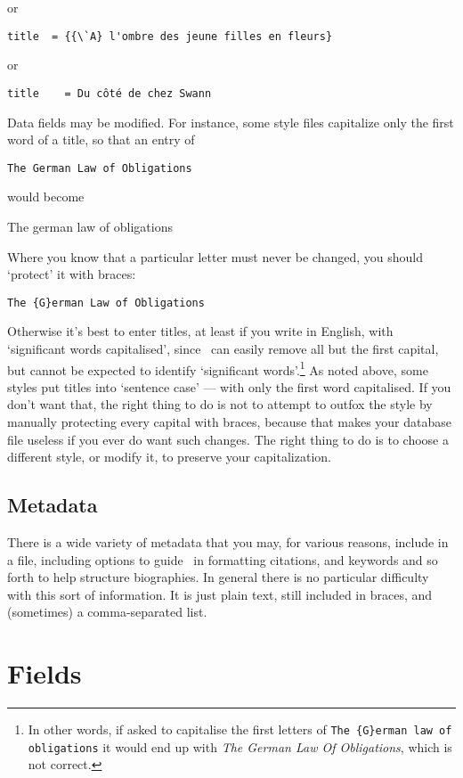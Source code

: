 {\begin{center}
or

\verb|title  = {{\`A} l'ombre des jeune filles en fleurs}|

or

\verb|title    = Du côté de chez Swann|
\end{center}

Data fields may be modified. For instance, some style files capitalize only the first word of a title, so that an entry of
\begin{center}
\verb|The German Law of Obligations|
\end{center}
would become
\begin{center}
The german law of obligations
\end{center}
Where you know that a particular letter must never be changed, you should `protect' it with braces:
\begin{center}
\verb|The {G}erman Law of Obligations|
\end{center}
Otherwise it's best to enter titles, at least if you write in English, with `significant words capitalised', since \biblatex\ can easily remove all but the first capital, but cannot be expected to identify `significant words'.\footnote{In other words, if asked to capitalise the first letters of \texttt{The \{G\}erman law of obligations} it would end up with \emph{The German Law Of Obligations}, which is not correct.} As noted above, some styles put titles into `sentence case' --- with only the first word capitalised. If you don't want that, the right thing to do is not to attempt to outfox the style by manually protecting every capital with braces, because that makes your database file useless if you ever do want such changes. The right thing to do is to choose a different style, or modify it, to preserve your capitalization.

\subsection{Metadata}

There is a wide variety of metadata that you may, for various reasons, include in a file, including options to guide \biblatex\ in formatting citations, and keywords and so forth to help structure biographies. In general there is no particular difficulty with this sort of information. It is just plain text, still included in braces, and (sometimes) a comma-separated list.

\section{Fields}

}
